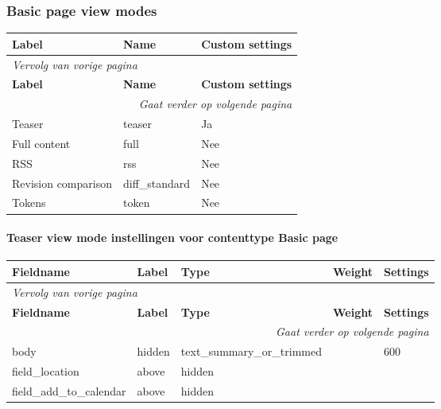 \subsubsection{Basic page view modes}
  \begin{longtable}{| p{5.00cm}|p{5.00cm}|p{5.00cm}|}
  \hline
  \rowcolor{tableheader}
  \textbf{Label} & \textbf{Name} & \textbf{Custom settings}  \tabularnewline
  \hline
\endfirsthead
\multicolumn{3}{l}{\textit{Vervolg van vorige pagina}} \\
\hline
\rowcolor{tableheader}
  \textbf{Label} & \textbf{Name} & \textbf{Custom settings}  \tabularnewline
  \hline
\hline
\endhead
\multicolumn{3}{r}{\textit{Gaat verder op volgende pagina}} \\
\endfoot
\hline
\endlastfoot
  Teaser & teaser & Ja  \tabularnewline
  \hline
  Full content & full & Nee  \tabularnewline
  \hline
  RSS & rss & Nee  \tabularnewline
  \hline
  Revision comparison & diff\_standard & Nee  \tabularnewline
  \hline
  Tokens & token & Nee  \tabularnewline
  \hline
  \end{longtable}

\paragraph{Teaser view mode instellingen voor contenttype Basic page }

  \begin{longtable}{| p{3.00cm}|p{3.00cm}|p{3.00cm}|p{3.00cm}|p{3.00cm}|}
  \hline
  \rowcolor{tableheader}
  \textbf{Fieldname} & \textbf{Label} & \textbf{Type} & \textbf{Weight} & \textbf{Settings}  \tabularnewline
  \hline
\endfirsthead
\multicolumn{5}{l}{\textit{Vervolg van vorige pagina}} \\
\hline
\rowcolor{tableheader}
  \textbf{Fieldname} & \textbf{Label} & \textbf{Type} & \textbf{Weight} & \textbf{Settings}  \tabularnewline
  \hline
\hline
\endhead
\multicolumn{5}{r}{\textit{Gaat verder op volgende pagina}} \\
\endfoot
\hline
\endlastfoot
  body & hidden & text\_summary\_or\_trimmed &   & 600  \tabularnewline
  \hline
  field\_location & above & hidden &   &    \tabularnewline
  \hline
  field\_add\_to\_calendar & above & hidden &   &    \tabularnewline
  \hline
  \end{longtable}

